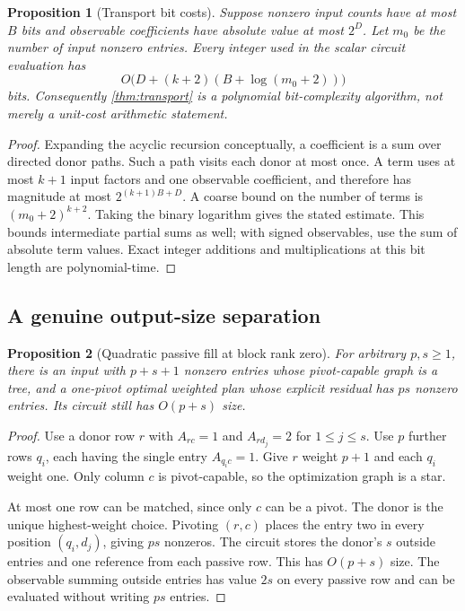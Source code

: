 \documentclass[11pt,letterpaper]{article}
\newtheorem{proposition}[proposition]{Proposition}\aliascntresetthe{proposition}
\theoremstyle{definition}
\theoremstyle{remark}
\begin{document}
\begin{proposition}[Transport bit costs]
\label{prop:transportbits}
Suppose nonzero input counts have at most $B$ bits and observable coefficients have absolute value at most $2^D$. Let $m_0$ be the number of input nonzero entries. Every integer used in the scalar circuit evaluation has
\[
 O\bigl(D+(k+2)(B+\log(m_0+2))\bigr)
\]
bits. Consequently \cref{thm:transport} is a polynomial bit-complexity algorithm, not merely a unit-cost arithmetic statement.
\end{proposition}
\begin{proof}
Expanding the acyclic recursion conceptually, a coefficient is a sum over directed donor paths. Such a path visits each donor at most once. A term uses at most $k+1$ input factors and one observable coefficient, and therefore has magnitude at most $2^{(k+1)B+D}$. A coarse bound on the number of terms is $(m_0+2)^{k+2}$. Taking the binary logarithm gives the stated estimate. This bounds intermediate partial sums as well; with signed observables, use the sum of absolute term values. Exact integer additions and multiplications at this bit length are polynomial-time.
\end{proof}

\subsection{A genuine output-size separation}
\begin{proposition}[Quadratic passive fill at block rank zero]
\label{prop:fillbarrier}
For arbitrary $p,s\ge1$, there is an input with $p+s+1$ nonzero entries whose pivot-capable graph is a tree, and a one-pivot optimal weighted plan whose explicit residual has $ps$ nonzero entries. Its circuit still has $O(p+s)$ size.
\end{proposition}
\begin{proof}
Use a donor row $r$ with $A_{rc}=1$ and $A_{r d_j}=2$ for $1\le j\le s$. Use $p$ further rows $q_i$, each having the single entry $A_{q_i c}=1$. Give $r$ weight $p+1$ and each $q_i$ weight one. Only column $c$ is pivot-capable, so the optimization graph is a star.

At most one row can be matched, since only $c$ can be a pivot. The donor is the unique highest-weight choice. Pivoting $(r,c)$ places the entry two in every position $(q_i,d_j)$, giving $ps$ nonzeros. The circuit stores the donor's $s$ outside entries and one reference from each passive row. This has $O(p+s)$ size. The observable summing outside entries has value $2s$ on every passive row and can be evaluated without writing $ps$ entries.
\end{proof}
\end{document}

